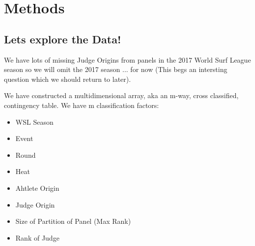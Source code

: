 \documentclass[12pt,a4paper]{article}
\begin{document}
\section{Methods}
\subsection{Lets explore the Data!}
We have lots of missing Judge Origins from panels in the 2017 World Surf League season so we will omit the 2017 season ... for now (This begs an intersting question which we should return to later).


We have constructed a multidimensional array, aka an m-way, cross classified, contingency table. We have m classification factors:

\begin{itemize}
\item WSL Season


\item Event


\item Round


\item Heat


\item Ahtlete Origin


\item Judge Origin


\item Size of Partition of Panel (Max Rank)


\item Rank of Judge

\end{itemize}
\end{document}
